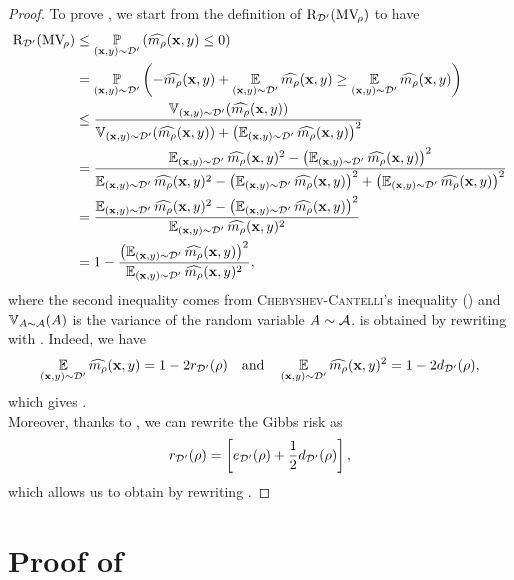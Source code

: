 \begin{noaddcontents}
\theoremgeneralcbound*
\begin{proof}
To prove , we start from the definition of $\Risk_{\Dp}(\MVQ)$ to have
\begin{align*}
    \Risk_{\Dp}(\MVQ) &\le \PP_{(\x,\y)\sim\Dp}\LP\OmMaQ(\x,\y) \le 0\RP\\
    &= \PP_{(\x,\y)\sim\Dp}\LP -\OmMaQ(\x,\y) + \EE_{(\x,\y)\sim\Dp}\OmMaQ(\x,\y) \ge \EE_{(\x,\y)\sim\Dp}\OmMaQ(\x,\y)\RP\\
    &\le \frac{\VAR_{(\x,\y)\sim\Dp}(\OmMaQ(\x,\y))}{\VAR_{(\x,\y)\sim\Dp}(\OmMaQ(\x,\y)) + \LP\EE_{(\x,\y)\sim\Dp}\OmMaQ(\x,\y)\RP^2}\\
    &= \frac{\EE_{(\x,\y)\sim\Dp}\OmMaQ(\x,\y)^2-\LP\EE_{(\x,\y)\sim\Dp}\OmMaQ(\x,\y)\RP^2 }{\EE_{(\x,\y)\sim\Dp}\OmMaQ(\x,\y)^2-\LP\EE_{(\x,\y)\sim\Dp}\OmMaQ(\x,\y)\RP^2 + \LP\EE_{(\x,\y)\sim\Dp}\OmMaQ(\x,\y)\RP^2}\\
    &= \frac{\EE_{(\x,\y)\sim\Dp}\OmMaQ(\x,\y)^2-\LP\EE_{(\x,\y)\sim\Dp}\OmMaQ(\x,\y)\RP^2 }{\EE_{(\x,\y)\sim\Dp}\OmMaQ(\x,\y)^2}\\
    &= 1 - \frac{\LP\EE_{(\x,\y)\sim\Dp}\OmMaQ(\x,\y)\RP^2}{\EE_{(\x,\y)\sim\Dp}\OmMaQ(\x,\y)^2},
\end{align*}
where the second inequality comes from \textsc{Chebyshev}-\textsc{Cantelli}'s inequality () and $\VAR_{A\sim\Acal}(A)$ is the variance of the random variable $A\sim\Acal$.
 is obtained by rewriting  with .
Indeed, we have 
\begin{align*}
    \EE_{(\x,\y)\sim\Dp}\OmMaQ(\x,\y) = 1-2r_{\Dp}(\Q) \quad\text{and}\quad \EE_{(\x,\y)\sim\Dp}\OmMaQ(\x,\y)^2 = 1-2d_{\Dp}(\Q), 
\end{align*}
which gives .\\
Moreover, thanks to , we can rewrite the Gibbs risk as
\begin{align*}
    r_{\Dp}(\Q) = \LB e_{\Dp}(\Q) + \frac{1}{2}d_{\Dp}(\Q)\RB,
\end{align*}
which allows us to obtain  by rewriting .
\end{proof}

\section{Proof of }
\label{ap:pac-bayes:sec:proof-relationship}


\end{noaddcontents}
